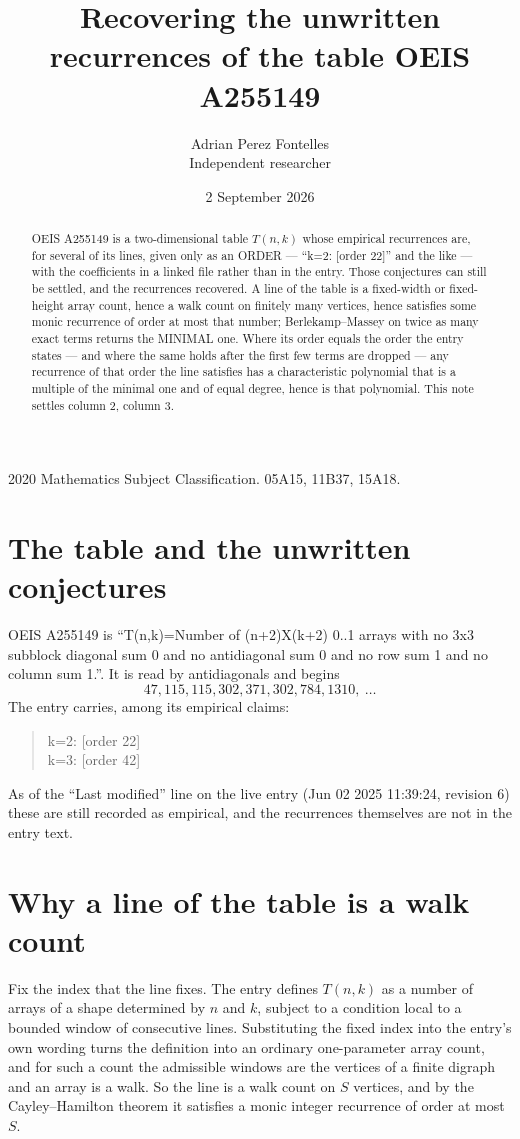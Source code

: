 \documentclass[11pt,a4paper]{article}
\title{Recovering the unwritten recurrences of the table OEIS A255149}
\author{Adrian Perez Fontelles\\ \small Independent researcher}
\date{2 September 2026}
\theoremstyle{plain}
\theoremstyle{definition}
\begin{document}
\maketitle

\begin{abstract}
OEIS A255149 is a two-dimensional table $T(n,k)$ whose empirical recurrences are, for several of
its lines, given only as an ORDER --- ``k=2: [order 22]'' and the like --- with the
coefficients in a linked file rather than in the entry. Those conjectures can still be settled,
and the recurrences recovered. A line of the table is a fixed-width or fixed-height array
count, hence a walk count on finitely many vertices, hence satisfies some monic recurrence of
order at most that number; Berlekamp--Massey on twice as many exact terms returns the MINIMAL
one. Where its order equals the order the entry states --- and where the same holds after the
first few terms are dropped --- any recurrence of that order the line satisfies has a
characteristic polynomial that is a multiple of the minimal one and of equal degree, hence is
that polynomial. This note settles column 2, column 3.
\end{abstract}

\noindent\small 2020 Mathematics Subject Classification. 05A15, 11B37, 15A18.\normalsize

\section{The table and the unwritten conjectures}

OEIS A255149 is ``T(n,k)=Number of (n+2)X(k+2) 0..1 arrays with no 3x3 subblock diagonal sum 0 and no antidiagonal sum 0 and no row sum 1 and no column sum 1.''. It is read by antidiagonals and begins
\[
47, 115, 115, 302, 371, 302, 784, 1310,\ \dots
\]
The entry carries, among its empirical claims:
\begin{quote}\small
k=2: [order 22]\\
k=3: [order 42]
\end{quote}
As of the ``Last modified'' line on the live entry (Jun 02 2025 11:39:24, revision 6) these are still
recorded as empirical, and the recurrences themselves are not in the entry text.

\section{Why a line of the table is a walk count}

Fix the index that the line fixes. The entry defines $T(n,k)$ as a number of arrays of a shape
determined by $n$ and $k$, subject to a condition local to a bounded window of consecutive
lines. Substituting the fixed index into the entry's own wording turns the definition into an
ordinary one-parameter array count, and for such a count the admissible windows are the
vertices of a finite digraph and an array is a walk. So the line is a walk count on $S$
vertices, and by the Cayley--Hamilton theorem it satisfies a monic integer recurrence of order
at most $S$.
\end{document}
